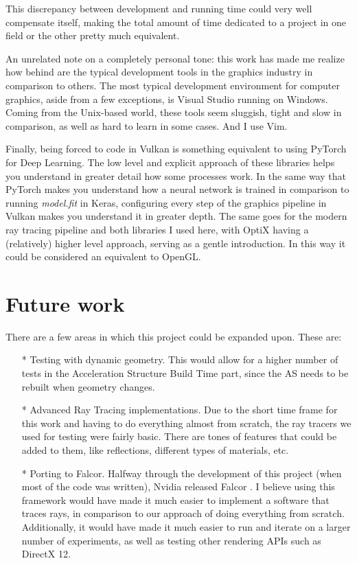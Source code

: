 This discrepancy between development and running time could very well compensate itself, making the total amount of time dedicated to a project in one field or the other pretty much equivalent.

An unrelated note on a completely personal tone: this work has made me realize how behind are the typical development tools in the graphics industry in comparison to others. The most typical development environment for computer graphics, aside from a few exceptions, is Visual Studio running on Windows. Coming from the Unix-based world, these tools seem sluggish, tight and slow in comparison, as well as hard to learn in some cases. And I use Vim.

Finally, being forced to code in Vulkan is something equivalent to using PyTorch for Deep Learning. The low level and explicit approach of these libraries helps you understand in greater detail how some processes work. In the same way that PyTorch makes you understand how a neural network is trained in comparison to running \textit{model.fit} in Keras, configuring every step of the graphics pipeline in Vulkan makes you understand it in greater depth. The same goes for the modern ray tracing pipeline and both libraries I used here, with OptiX having a (relatively) higher level approach, serving as a gentle introduction. In this way it could be considered an equivalent to OpenGL.

\section{Future work}

There are a few areas in which this project could be expanded upon. These are:

\begin{itemize}
  \item[*]{Testing with dynamic geometry. This would allow for a higher number of tests in the Acceleration Structure Build Time part, since the AS needs to be rebuilt when geometry changes.}
  \item[*]{Advanced Ray Tracing implementations. Due to the short time frame for this work and having to do everything almost from scratch, the ray tracers we used for testing were fairly basic. There are tones of features that could be added to them, like reflections, different types of materials, etc.}
  \item[*]{Porting to Falcor. Halfway through the development of this project (when most of the code was written), Nvidia released Falcor \cite{Kallweit22}. I believe using this framework would have made it much easier to implement a software that traces rays, in comparison to our approach of doing everything from scratch. Additionally, it would have made it much easier to run and iterate on a larger number of experiments, as well as testing other rendering APIs such as DirectX 12.}
\end{itemize}
